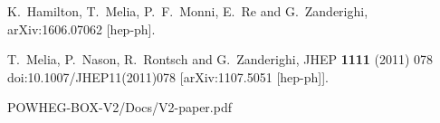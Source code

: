 \documentclass{article}
\begin{document}
\begin{thebibliography}{1}

  K.~Hamilton, T.~Melia, P.~F.~Monni, E.~Re and G.~Zanderighi,
  arXiv:1606.07062 [hep-ph].

  T.~Melia, P.~Nason, R.~Rontsch and G.~Zanderighi,
  JHEP {\bf 1111} (2011) 078
  doi:10.1007/JHEP11(2011)078
  [arXiv:1107.5051 [hep-ph]].
  
POWHEG-BOX-V2/Docs/V2-paper.pdf
\end{thebibliography}
\end{document}
